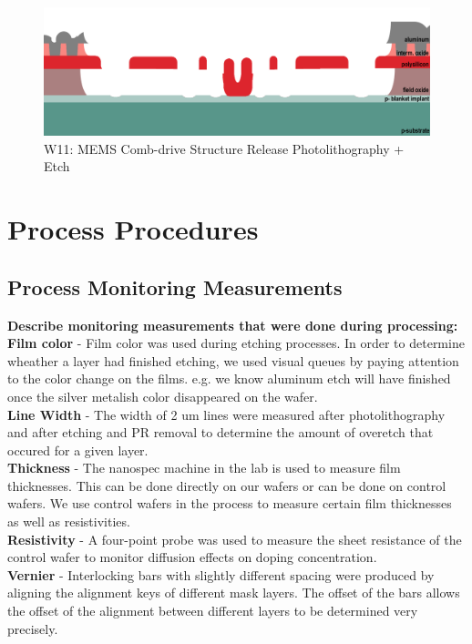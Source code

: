 \documentclass{article}
\begin{document}
\begin{figure}[H]
\centering
\includegraphics[width=350pt]{CrossSections/MEMSlabprofiles/MEMSw11.png}
\caption{W11: MEMS Comb-drive Structure Release Photolithography + Etch}
\end{figure}


\section{Process Procedures}
\subsection{Process Monitoring Measurements}

\textbf{Describe monitoring measurements that were done during processing:} \\

\textbf{Film color} - 
Film color was used during etching processes. In order to determine wheather a layer had finished etching, we used visual queues by paying attention to the color change on the films. e.g. we know aluminum etch will have finished once the silver metalish color disappeared on the wafer. \\
 
\textbf{Line Width} - 
The width of 2 um lines were measured after photolithography and after etching and PR removal to determine the amount of overetch that occured for a given layer. \\

\textbf{Thickness} -
The nanospec machine in the lab is used to measure film thicknesses. This can be done directly on our wafers or can be done on control wafers. We use control wafers in the process to measure certain film thicknesses as well as resistivities. \\

\textbf{Resistivity} - 
A four-point probe was used to measure the sheet resistance of the control wafer to monitor diffusion effects on doping concentration. \\

\textbf{Vernier} - 
Interlocking bars with slightly different spacing were produced by aligning the alignment keys of different mask layers. The offset of the bars allows the offset of the alignment between different layers to be determined very precisely. \\
\end{document}
